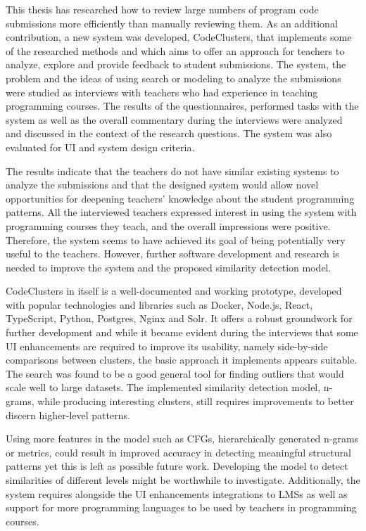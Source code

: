 This thesis has researched how to review large numbers of program code submissions more efficiently than manually reviewing them. As an additional contribution, a new system was developed, CodeClusters, that implements some of the researched methods and which aims to offer an approach for teachers to analyze, explore and provide feedback to student submissions. The system, the problem and the ideas of using search or modeling to analyze the submissions were studied as interviews with teachers who had experience in teaching programming courses. The results of the questionnaires, performed tasks with the system as well as the overall commentary during the interviews were analyzed and discussed in the context of the research questions. The system was also evaluated for UI and system design criteria.

The results indicate that the teachers do not have similar existing systems to analyze the submissions and that the designed system would allow novel opportunities for deepening teachers' knowledge about the student programming patterns. All the interviewed teachers expressed interest in using the system with programming courses they teach, and the overall impressions were positive. Therefore, the system seems to have achieved its goal of being potentially very useful to the teachers. However, further software development and research is needed to improve the system and the proposed similarity detection model.

CodeClusters in itself is a well-documented and working prototype, developed with popular technologies and libraries such as Docker, Node.js, React, TypeScript, Python, Postgres, Nginx and Solr. It offers a robust groundwork for further development and while it became evident during the interviews that some UI enhancements are required to improve its usability, namely side-by-side comparisons between clusters, the basic approach it implements appears suitable. The search was found to be a good general tool for finding outliers that would scale well to large datasets. The implemented similarity detection model, n-grams, while producing interesting clusters, still requires improvements to better discern higher-level patterns.

Using more features in the model such as CFGs, hierarchically generated n-grams or metrics, could result in improved accuracy in detecting meaningful structural patterns yet this is left as possible future work. Developing the model to detect similarities of different levels might be worthwhile to investigate. Additionally, the system requires alongside the UI enhancements integrations to LMSs as well as support for more programming languages to be used by teachers in programming courses.

